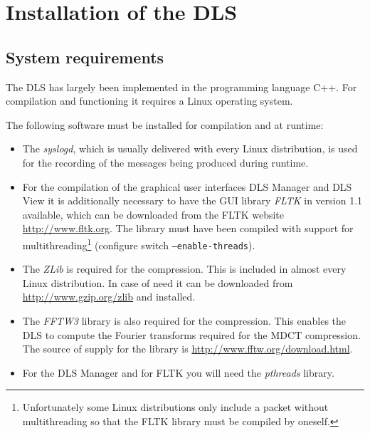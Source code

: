 \documentclass[a4paper,12pt,BCOR6mm,bibtotoc,idxtotoc]{scrbook}
\begin{document}

\appendix

\chapter{Installation of the DLS} \label{sec:apx_install} 

\section{System requirements}

The DLS has largely been implemented in the programming language
C++. For compilation and functioning it requires a Linux operating
system.

The following software must be installed for compilation and at runtime:

\begin{itemize}

\item The \textit{syslogd}, which is usually delivered with
every Linux distribution, is used for the recording of the messages being
produced during runtime.

\item For the compilation of the graphical user interfaces DLS
Manager and DLS View it is additionally
necessary to have the GUI library \textit{FLTK} in version 1.1
available, which can be downloaded from the FLTK website
\url{http://www.fltk.org}. The library must have been compiled with support
for multithreading\footnote{Unfortunately some Linux distributions only
include a packet without multithreading so that the FLTK library must be
compiled by oneself.} (configure switch \texttt{--enable-threads}).

\item The \textit{ZLib} is required for the compression. This is included in
almost every Linux distribution. In case of need it can be downloaded from
\url{http://www.gzip.org/zlib} and installed.

\item The \textit{FFTW3} library is also required for the compression. This
enables the DLS to compute the Fourier transforms required for the MDCT
compression. The source of supply for the library is
\url{http://www.fftw.org/download.html}.

\item For the DLS Manager and for FLTK you will need the \textit{pthreads}
library.

\end{itemize}
\end{document}
